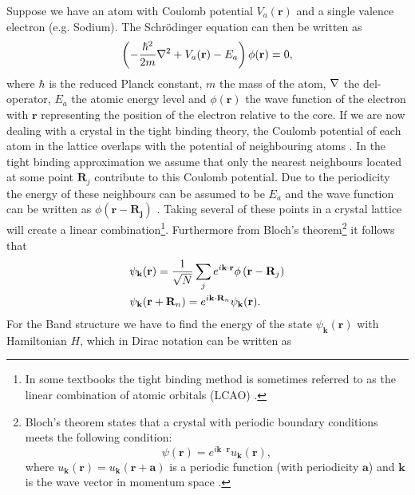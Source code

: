 Suppose we have an atom with Coulomb potential $V_a(\mathbf{r})$ and a single valence electron (e.g. Sodium). The Schrödinger equation can then be written as \cite{Quinn2018}
\begin{equation}\label{eq:schrödinger}
    \left(-\frac{\hbar^2}{2m}\nabla^2+V_a(\mathbf{r})-E_a\right)\phi(\mathbf{r})=0,
\end{equation}
where $\hbar$ is the reduced Planck constant, $m$ the mass of the atom, $\nabla$ the del-operator, $E_a$ the atomic energy level and $\phi(\mathbf{r})$ the wave function of the electron with $\mathbf{r}$ representing the position of the electron relative to the core. If we are now dealing with a crystal in the tight binding theory, the Coulomb potential of each atom in the lattice overlaps with the potential of neighbouring atoms \cite{Quinn2018}. In the tight binding approximation we assume that only the nearest neighbours located at some point $\mathbf{R}_j$ contribute to this Coulomb potential. Due to the periodicity the energy of these neighbours can be assumed to be $E_a$ and the wave function can be written as $\phi(\mathbf{r-\mathbf{R}_j})$ \cite{Quinn2018}. Taking several of these points in a crystal lattice will create a linear combination\footnote{In some textbooks the tight binding method is sometimes referred to as the linear combination of atomic orbitals (LCAO) \cite{Patterson2007}.}. Furthermore from Bloch's theorem\footnote{Bloch's theorem states that a crystal with periodic boundary conditions meets the following condition: 
\begin{equation}
     \psi (\mathbf{r}) = e^{i \mathbf{k}\cdot\mathbf{r}}u_\mathbf{k}(\mathbf{r}),
\end{equation}
where $u_\mathbf{k}(\mathbf{r}) = u_\mathbf{k}(\mathbf{r}+\mathbf{a})$ is a periodic function (with periodicity $\mathbf{a}$) and $\mathbf{k}$ is the wave vector in momentum space \cite{Quinn2018}.} it follows that \cite{Quinn2018}
\begin{equation}\label{eq:psi}
\begin{split}
    &\psi_\mathbf{k}(\mathbf{r})=\frac{1}{\sqrt{N}}\sum_j e^{i \mathbf{k}\cdot\mathbf{r}}\phi\left(\mathbf{r}-\mathbf{R}_j\right)\\
    &\psi_\mathbf{k}(\mathbf{r}+\mathbf{R}_n)=e^{i \mathbf{k}\cdot\mathbf{R}_n}\psi_\mathbf{k}(\mathbf{r}).
\end{split}
\end{equation}
For the Band structure we have to find the energy of the state $\psi_\mathbf{k}(\mathbf{r})$ with Hamiltonian $H$, which in Dirac notation can be written as \cite{Quinn2018}
